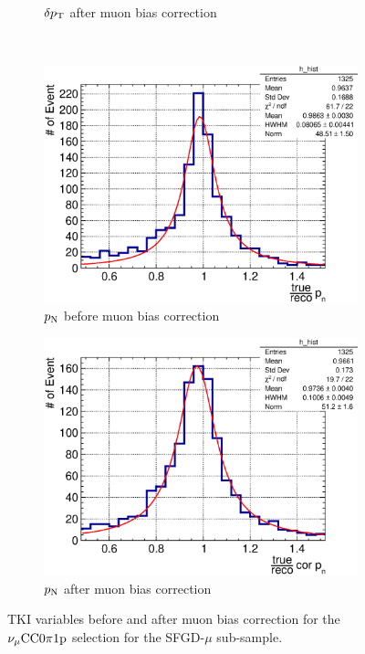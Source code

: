 \begin{figure}
\begin{subfigure}[b]{\dbfigwid\textwidth}
               \caption{$\delta p_\textrm{T}$ after muon bias correction}
               \label{subfig:esc-dpt-afmu-sfgmu}
          \end{subfigure}
          \\
          \begin{subfigure}[b]{\dbfigwid\textwidth}
               \centering
               \includegraphics[width=\textwidth]{figures/perf/tki/pn_rat_hist_al11_sfgmu.eps}
               \caption{$p_\textrm{N}$ before muon bias correction}
               \label{subfig:esc-pn-bfmu-sfgmu}
          \end{subfigure}
          \begin{subfigure}[b]{\dbfigwid\textwidth}
               \centering
               \includegraphics[width=\textwidth]{figures/perf/tki/cor_pn_rat_hist_al11_sfgmu.eps}
               \caption{$p_\textrm{N}$ after muon bias correction}
               \label{subfig:esc-pn-afmu-sfgmu}
          \end{subfigure}
          \caption{TKI variables before and after muon bias correction for the $\nu_{\mu}\textrm{CC}0\pi1\textrm{p}$ selection for the SFGD-$\mu$ sub-sample.}
          \label{fig:mc-tki-0pi-mu-sfgmu}
     \end{figure}
 